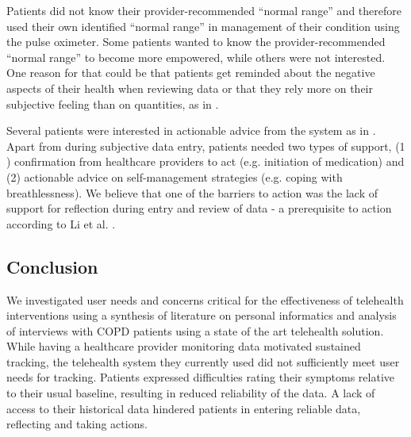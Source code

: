 Patients did not know their provider-recommended “normal range” and therefore used their own identified “normal range” in management of their condition using the pulse oximeter. Some patients wanted to know the provider-recommended “normal range” to become more empowered, while others were not interested. One reason for that could be that patients get reminded about the negative aspects of their health when reviewing data or that they rely more on their subjective feeling than on quantities, as in \cite{Ancker2015}. 

Several patients were interested in actionable advice from the system as in \cite{Chung2015, Li2010}. Apart from during subjective data entry, patients needed two types of support, (1 ) confirmation from healthcare providers to act (e.g. initiation of medication) and (2) actionable advice on self-management strategies (e.g. coping with breathlessness). We believe that one of the barriers to action was the lack of support for reflection during entry and review of data  - a prerequisite to action according to Li et al. \cite{Li2010}.

\subsection{Conclusion}
We investigated user needs and concerns critical for the effectiveness of telehealth interventions using a synthesis of literature on personal informatics and analysis of interviews with COPD patients using a state of the art telehealth solution. While having a healthcare provider monitoring data motivated sustained tracking, the telehealth system they currently used did not sufficiently meet user needs for tracking. Patients expressed difficulties rating their symptoms relative to their usual baseline, resulting in reduced reliability of the data. A lack of access to their historical data hindered patients in entering reliable data, reflecting and taking actions. 